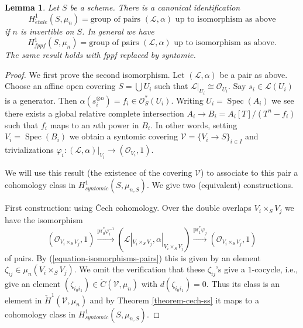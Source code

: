 \documentclass[10pt,a4paper]{amsart}
\theoremstyle{plain}
\newtheorem{lemma}[subsection]{Lemma}
\theoremstyle{definition}
\theoremstyle{remark}
\numberwithin{equation}{subsection}
\def\Spec{\mathop{\mathrm{Spec}}}
\def\etale{{\acute{e}tale}}
\begin{document}
\begin{lemma}
\label{lemma-describe-h1-mun}
Let $S$ be a scheme. There is a canonical identification
$$
H_\etale^1(S, \mu_n) =
\text{group of pairs }(\mathcal{L}, \alpha)\text{ up to isomorphism as above}
$$
if $n$ is invertible on $S$. In general we have
$$
H_{fppf}^1(S, \mu_n) =
\text{group of pairs }(\mathcal{L}, \alpha)\text{ up to isomorphism as above}.
$$
The same result holds with fppf replaced by syntomic.
\end{lemma}

\begin{proof}
We first prove the second isomorphism.
Let $(\mathcal{L}, \alpha)$ be a pair as above.
Choose an affine open covering $S = \bigcup U_i$ such that
$\mathcal{L}|_{U_i} \cong \mathcal{O}_{U_i}$. Say $s_i \in \mathcal{L}(U_i)$
is a generator. Then $\alpha(s_i^{\otimes n}) = f_i \in \mathcal{O}_S^*(U_i)$.
Writing $U_i = \Spec(A_i)$ we see there exists a global
relative complete intersection $A_i \to B_i = A_i[T]/(T^n - f_i)$
such that $f_i$ maps to an $n$th power in $B_i$. In other words, setting
$V_i = \Spec(B_i)$ we obtain a syntomic covering
$\mathcal{V} = \{V_i \to S\}_{i \in I}$ and trivializations
$\varphi_i : (\mathcal{L}, \alpha)|_{V_i} \to (\mathcal{O}_{V_i}, 1)$.

\medskip\noindent
We will use this result (the existence of the covering $\mathcal{V}$)
to associate to this pair a cohomology class in
$H^1_{syntomic}(S, \mu_{n, S})$. We give two (equivalent) constructions.

\medskip\noindent
First construction: using {\v C}ech cohomology.
Over the double overlaps $V_i \times_S V_j$ we have the isomorphism
$$
(\mathcal{O}_{V_i \times_S V_j}, 1)
\xrightarrow{\text{pr}_0^*\varphi_i^{-1}}
(\mathcal{L}|_{V_i \times_S V_j}, \alpha|_{V_i \times_S V_j})
\xrightarrow{\text{pr}_1^*\varphi_j}
(\mathcal{O}_{V_i \times_S V_j}, 1)
$$
of pairs. By (\ref{equation-isomorphisms-pairs}) this is given by an
element $\zeta_{ij} \in \mu_n(V_i \times_S V_j)$. We omit the verification
that these $\zeta_{ij}$'s give a $1$-cocycle, i.e., give
an element $(\zeta_{i_0i_1}) \in \check C(\mathcal{V}, \mu_n)$
with $d(\zeta_{i_0i_1}) = 0$. Thus its class is an element in
$\check H^1(\mathcal{V}, \mu_n)$ and by
Theorem \ref{theorem-cech-ss}
it maps to a cohomology class in $H^1_{syntomic}(S, \mu_{n, S})$.


\end{proof}
\end{document}
